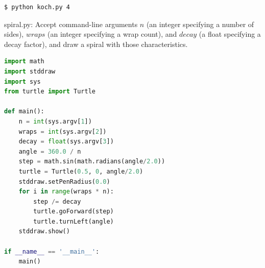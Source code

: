 \documentclass[8pt,a4paper,compress]{beamer}
\begin{document}
\begin{frame}[fragile]
\pause
\bigskip

\begin{minipage}{200pt}
\begin{lstlisting}[language={}]
$ python koch.py 4
\end{lstlisting}
\end{minipage}%
\hfill
\begin{minipage}{100pt}
\begin{center}
\end{center}
\end{minipage}
\end{frame}

\begin{frame}[fragile]
\pause

\begin{framed}
\tiny spiral.py: Accept command-line arguments $n$ (an integer specifying a number  of sides), $wraps$ (an integer specifying a wrap count), and $decay$ (a float specifying a decay factor), and draw a spiral with those characteristics.
\end{framed}

\begin{lstlisting}[language=Python]
import math
import stddraw
import sys
from turtle import Turtle

def main():
    n = int(sys.argv[1])
    wraps = int(sys.argv[2])
    decay = float(sys.argv[3])
    angle = 360.0 / n
    step = math.sin(math.radians(angle/2.0))
    turtle = Turtle(0.5, 0, angle/2.0)
    stddraw.setPenRadius(0.0)
    for i in range(wraps * n):
        step /= decay
        turtle.goForward(step)
        turtle.turnLeft(angle)
    stddraw.show()
    
if __name__ == '__main__':
    main()
\end{lstlisting}
\end{frame}
\end{document}
